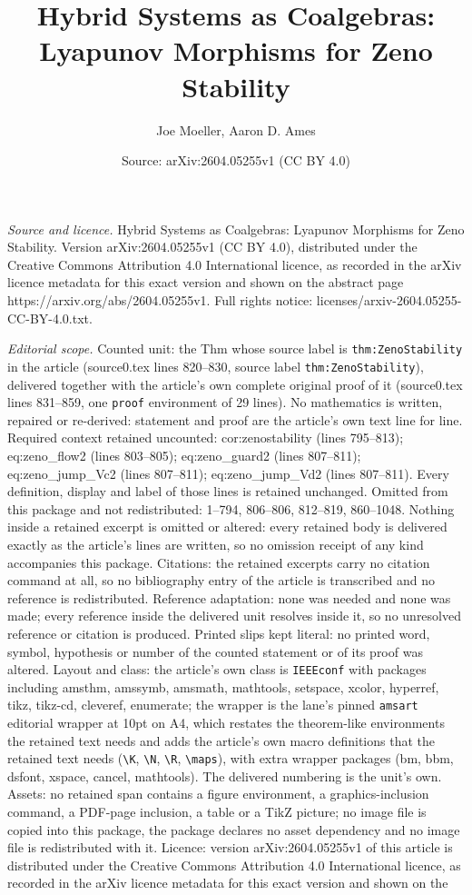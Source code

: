 \documentclass[10pt,a4paper]{amsart}
\title[Hybrid Systems as Coalgebras: Lyapunov Morphisms for Zeno St]{Hybrid Systems as Coalgebras: Lyapunov Morphisms for Zeno Stability}
\author{Joe Moeller, Aaron D. Ames}
\date{Source: arXiv:2604.05255v1 (CC BY 4.0)}
\begin{document}
\maketitle

\noindent\emph{Source and licence.} Hybrid Systems as Coalgebras: Lyapunov Morphisms for Zeno Stability. Version arXiv:2604.05255v1 (CC BY 4.0), distributed under the Creative Commons Attribution 4.0 International licence, as recorded in the arXiv licence metadata for this exact version and shown on the abstract page https://arxiv.org/abs/2604.05255v1. Full rights notice: licenses/arxiv-2604.05255-CC-BY-4.0.txt.\par\smallskip

\noindent\textit{Editorial scope.} Counted unit: the Thm whose source label is \texttt{thm:ZenoStability} in the article (source0.tex lines 820--830, source label \texttt{thm:ZenoStability}), delivered together with the article's own complete original proof of it (source0.tex lines 831--859, one \texttt{proof} environment of 29 lines). No mathematics is written, repaired or re-derived: statement and proof are the article's own text line for line. Required context retained uncounted: cor:zenostability (lines 795--813); eq:zeno\_flow2 (lines 803--805); eq:zeno\_guard2 (lines 807--811); eq:zeno\_jump\_Vc2 (lines 807--811); eq:zeno\_jump\_Vd2 (lines 807--811). Every definition, display and label of those lines is retained unchanged. Omitted from this package and not redistributed: 1--794, 806--806, 812--819, 860--1048. Nothing inside a retained excerpt is omitted or altered: every retained body is delivered exactly as the article's lines are written, so no omission receipt of any kind accompanies this package. Citations: the retained excerpts carry no citation command at all, so no bibliography entry of the article is transcribed and no reference is redistributed. Reference adaptation: none was needed and none was made; every reference inside the delivered unit resolves inside it, so no unresolved reference or citation is produced. Printed slips kept literal: no printed word, symbol, hypothesis or number of the counted statement or of its proof was altered. Layout and class: the article's own class is \texttt{IEEEconf} with packages including amsthm, amssymb, amsmath, mathtools, setspace, xcolor, hyperref, tikz, tikz-cd, cleveref, enumerate; the wrapper is the lane's pinned \texttt{amsart} editorial wrapper at 10pt on A4, which restates the theorem-like environments the retained text needs and adds the article's own macro definitions that the retained text needs (\texttt{\textbackslash K}, \texttt{\textbackslash N}, \texttt{\textbackslash R}, \texttt{\textbackslash maps}), with extra wrapper packages (bm, bbm, dsfont, xspace, cancel, mathtools). The delivered numbering is the unit's own. Assets: no retained span contains a figure environment, a graphics-inclusion command, a PDF-page inclusion, a table or a TikZ picture; no image file is copied into this package, the package declares no asset dependency and no image file is redistributed with it. Licence: version arXiv:2604.05255v1 of this article is distributed under the Creative Commons Attribution 4.0 International licence, as recorded in the arXiv licence metadata for this exact version and shown on the 
\end{document}
